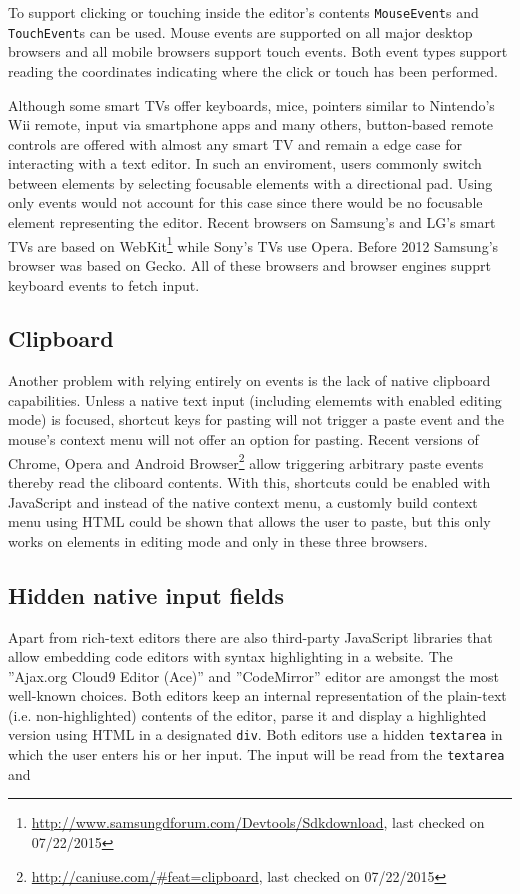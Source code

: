 To support clicking or touching inside the editor's contents \texttt{MouseEvent}s and \texttt{TouchEvent}s can be used. Mouse events are supported on all major desktop browsers and all mobile browsers support touch events. Both event types support reading the coordinates indicating where the click or touch has been performed.

Although some smart TVs offer keyboards, mice, pointers similar to Nintendo's Wii remote, input via smartphone apps and many others, button-based remote controls are offered with almost any smart TV and remain a edge case for interacting with a text editor. In such an enviroment, users commonly switch between elements by selecting focusable elements with a directional pad. Using only events would not account for this case since there would be no focusable element representing the editor. Recent browsers on Samsung's and LG's smart TVs are based on WebKit\footnote{\url{http://www.samsungdforum.com/Devtools/Sdkdownload}, last checked on 07/22/2015} while Sony's TVs use Opera. Before 2012 Samsung's browser was based on Gecko. All of these browsers and browser engines supprt keyboard events to fetch input.

\subsection{Clipboard} Another problem with relying entirely on events is the lack of native clipboard capabilities. Unless a native text input (including elememts with enabled editing mode) is focused, shortcut keys for pasting will not trigger a paste event and the mouse's context menu will not offer an option for pasting. Recent versions of Chrome, Opera and Android Browser\footnote{\url{http://caniuse.com/\#feat=clipboard}, last checked on 07/22/2015} allow triggering arbitrary paste events thereby read the cliboard contents. With this, shortcuts could be enabled with JavaScript and instead of the native context menu, a customly build context menu using HTML could be shown that allows the user to paste, but this only works on elements in editing mode and only in these three browsers.

\subsection{Hidden native input fields} Apart from rich-text editors there are also third-party JavaScript libraries that allow embedding code editors with syntax highlighting in a website. The ''Ajax.org Cloud9 Editor (Ace)'' and ''CodeMirror'' editor are amongst the most well-known choices. Both editors keep an internal representation of the plain-text (i.e. non-highlighted) contents of the editor, parse it and display a highlighted version using HTML in a designated \texttt{div}. Both editors use a hidden \texttt{textarea} in which the user enters his or her input. The input will be read from the \texttt{textarea} and

